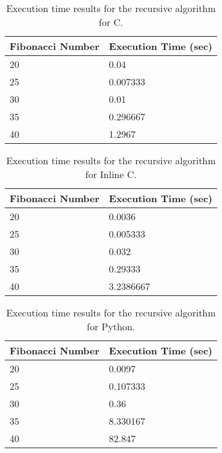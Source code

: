 \documentclass{sig-alternate}
\begin{document}
\begin{scriptsize}
\begin{table}[ht!]
  \centering
  \begin{tabular}{|l|l|}
    \hline
    \textbf{Fibonacci Number} & \textbf{Execution Time (sec)}\\
    \hline
    20 & 0.04\\
    \hline
    25 & 0.007333\\
	\hline
	30 & 0.01\\
	\hline
	35 & 0.296667\\
	\hline
	40 & 1.2967\\
	\hline
\end{tabular}
\caption{Execution time results for the recursive algorithm for C.}
\label{table:formatting}
\end{table}
\end{scriptsize}

\begin{scriptsize}
\begin{table}[ht!]
  \centering
  \begin{tabular}{|l|l|}
    \hline
    \textbf{Fibonacci Number} & \textbf{Execution Time (sec)}\\
    \hline
    20 & 0.0036\\
    \hline
    25 & 0.005333\\
	\hline
	30 & 0.032\\
	\hline
	35 & 0.29333\\
	\hline
	40 & 3.2386667\\
	\hline
\end{tabular}
\caption{Execution time results for the recursive algorithm for Inline C.}
\label{table:formatting}
\end{table}
\end{scriptsize}

\begin{scriptsize}
\begin{table}[ht!]
  \centering
  \begin{tabular}{|l|l|}
    \hline
    \textbf{Fibonacci Number} & \textbf{Execution Time (sec)}\\
    \hline
    20 & 0.0097\\
    \hline
    25 & 0.107333\\
	\hline
	30 & 0.36\\
	\hline
	35 & 8.330167\\
	\hline
	40 & 82.847\\
	\hline
\end{tabular}
\caption{Execution time results for the recursive algorithm for Python.}
\label{table:formatting}
\end{table}
\end{scriptsize}
\end{document}
